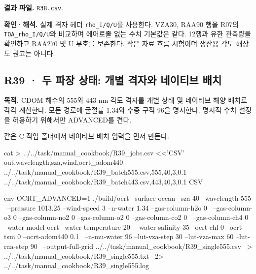 \textbf{결과 파일. }\texttt{R38.csv}.

\textbf{확인·해석. }실제 격자 헤더 \texttt{rho\_\allowbreak{}I/\allowbreak{}Q/\allowbreak{}U}를 사용한다. VZA30\textdegree{}, RAA90\textdegree{} 행을 R07의 \texttt{TOA\_\allowbreak{}rho\_\allowbreak{}I/\allowbreak{}Q/\allowbreak{}U}와 비교하며 에어로졸 없는 수치 기본값은 같다. 12행과 유한 관측량을 확인하고 RAA270\textdegree{} 및 U 부호를 보존한다. 작은 자료 흐름 시험이며 생산용 각도 해상도 권고는 아니다.


\subsection{R39 · 두 파장 상태: 개별 격자와 네이티브 배치}
\label{sec:auto:09_cookbook:7.2}

\label{recipe:R39}

\textbf{목적. }CDOM 해수의 555와 443 nm 각도 격자를 개별 상태 및 네이티브 해양 배치로 각각 계산한다. 모든 경로에 굴절률 1.34와 수중 구적 96을 명시한다. 명시적 수치 설정을 허용하기 위해서만 ADVANCED를 켠다.

같은 C 작업 폴더에서 네이티브 배치 입력을 먼저 만든다:

\noindent\begin{minipage}{\linewidth}
\begin{ManualCode}

cat > ../../task/manual_cookbook/R39_jobs.csv <<'CSV'
out,wavelength,sza,wind,ocrt_adom440
../../task/manual_cookbook/R39_batch555.csv,555,40,3,0.1
../../task/manual_cookbook/R39_batch443.csv,443,40,3,0.1
CSV

\end{ManualCode}
\end{minipage}\par

\noindent\begin{minipage}{\linewidth}
\begin{ManualCode}

env OCRT_ADVANCED=1 ./build/ocrt --surface ocean --sza 40 --wavelength 555 \
  --pressure 1013.25 --wind-speed 3 --n-water 1.34 --gas-column-h2o 0 \
  --gas-column-o3 0 --gas-column-no2 0 --gas-column-o2 0 --gas-column-co2 0 \
  --gas-column-ch4 0 --water-model ocrt --water-temperature 20 \
  --water-salinity 35 --ocrt-chl 0 --ocrt-tsm 0 --ocrt-adom440 0.1 \
  --n-mu-water 96 --lut-vza-step 30 --lut-vza-max 60 --lut-raa-step 90 \
  --output-full-grid ../../task/manual_cookbook/R39_single555.csv \
  > ../../task/manual_cookbook/R39_single555.txt \
  2> ../../task/manual_cookbook/R39_single555.log

\end{ManualCode}
\end{minipage}\par

